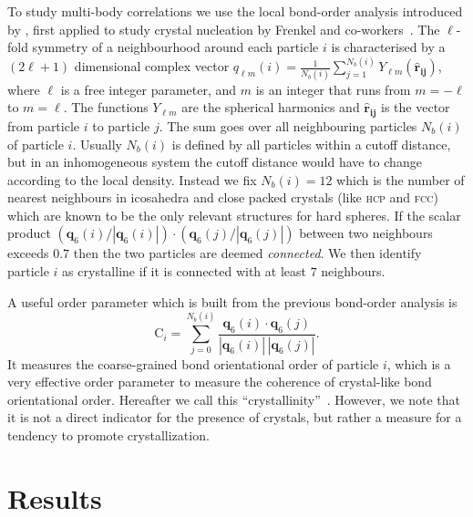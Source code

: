 \documentclass[twocolumn,superscriptaddress]{revtex4-1}
\begin{document}
To study multi-body correlations we use the local bond-order analysis introduced by
\citet{steinhardt}, first applied to study crystal nucleation by
Frenkel and co-workers~\cite{auer}. 
The $\ell$-fold symmetry of a neighbourhood around each particle $i$ is characterised by a $(2\ell+1)$ dimensional complex vector $q_{\ell m}(i)=\frac{1}{N_b(i)}\sum_{j=1}^{N_b(i)} Y_{\ell m}(\mathbf{\hat{r}_{ij}})$, where
$\ell$ is a free integer parameter, and $m$ is an integer
that runs from $m=-\ell$ to $m=\ell$. The functions $Y_{\ell m}$ are the spherical harmonics
and $\mathbf{\hat{r}_{ij}}$ is the vector from particle $i$ to particle $j$.
The sum goes over all neighbouring particles $N_b(i)$ of particle $i$. Usually 
$N_b(i)$ is defined by all particles within a cutoff distance, but in an inhomogeneous system
the cutoff distance would have to change according to the local density. Instead we 
fix $N_b(i)=12$ which is the number of nearest neighbours in icosahedra and close packed crystals (like \textsc{hcp} and \textsc{fcc})
which are known to be the only relevant structures for hard spheres.
If the scalar product $(\mathbf{q}_6(i)/|\mathbf{q}_6(i)|)\cdot(\mathbf{q}_6(j)/|\mathbf{q}_6(j)|)$ between
two neighbours exceeds $0.7$ then the two particles are deemed \emph{connected}. We then identify particle $i$ as crystalline
if it is connected with at least $7$ neighbours.

A useful order parameter which is built from the previous bond-order analysis is
\begin{equation}\label{eqn:crystallinity}
 \text{C}_i=\sum_{j=0}^{N_b(i)}\frac{\mathbf{q}_6(i)\cdot\mathbf{q}_6(j)}{|\mathbf{q}_6(i)|\,|\mathbf{q}_6(j)|}.
\end{equation}
It measures the coarse-grained bond orientational order of particle $i$, which is a very effective order parameter to
measure the coherence of crystal-like bond orientational order. Hereafter we call this ``crystallinity''~\cite{russo_hs}. 
However, we note that it is not a direct indicator for the presence of crystals, but rather a measure 
for a tendency to promote crystallization.  

\section{Results}
\end{document}
